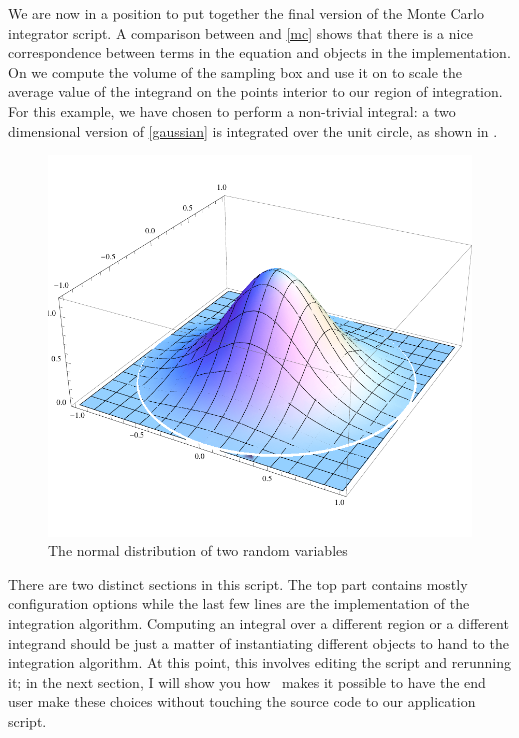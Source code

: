 We are now in a position to put together the final version of the Monte Carlo integrator
script.
%
%
A comparison between  and \eqref{mc} shows that there is a nice
correspondence between terms in the equation and objects in the implementation. On
 we compute the volume of the sampling box and use it on
 to scale the average value of the integrand on the points interior to
our region of integration. For this example, we have chosen to perform a non-trivial integral:
a two dimensional version of \eqref{gaussian} is integrated over the unit circle, as shown in
.
%
\begin{figure}
\centering
\includegraphics[scale=0.60]{figures/gaussian.pdf}
\caption{The normal distribution of two random variables\label{fig:gaussian}}
\end{figure}
%
There are two distinct sections in this script. The top part contains mostly configuration
options while the last few lines are the implementation of the integration algorithm. Computing
an integral over a different region or a different integrand should be just a matter of
instantiating different objects to hand to the integration algorithm. At this point, this
involves editing the script and rerunning it; in the next section, I will show you how
\pyre\ makes it possible to have the end user make these choices without touching the source
code to our application script.

